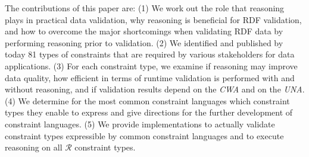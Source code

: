 \documentclass{acm_proc_article-sp}
\newcommand{\tb}[1]{\todo[size=\small, color=green!40]{\textbf{Thomas:} #1}}
\begin{document}
The contributions of this paper are:
(1) We work out the role that reasoning plays in practical data validation,
why reasoning is beneficial for RDF validation, and 
how to overcome the major shortcomings when validating RDF data by performing reasoning prior to validation. 
(2) We identified and published by today 81 types of constraints that are required by various stakeholders for data applications. 
(3) For each constraint type, we examine
    if reasoning may improve data quality, 
    how efficient in terms of runtime validation is performed with and without reasoning, and
		if validation results depend on the \emph{CWA} and on the \emph{UNA}.
(4) We determine for the most common constraint languages which constraint types they enable to express
    and give directions for the further development of constraint languages.
(5) We provide implementations to actually validate constraint types expressible by common constraint languages and 
to execute reasoning on all $\mathcal{R}$ constraint types.
	




\end{document}
